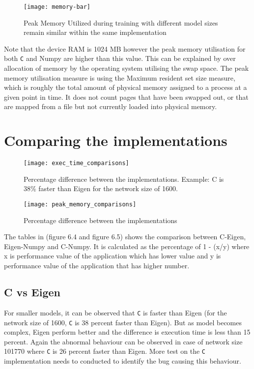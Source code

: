 \begin{figure}[!ht]
	\centering
	\texttt{[image: memory-bar]}
	\caption[Peak Memory Utilisation]{Peak Memory Utilized during training with different model sizes remain similar within the same implementation}
\end{figure}


Note that the device RAM is 1024 MB however the peak memory utilisation for both \verb!C! and Numpy are higher than this value. This can be explained by over allocation of memory by the operating system utilising the swap space. The peak memory utilisation measure is using the Maximum resident set size measure, which is roughly the total amount of physical memory assigned to a process at a given point in time. It does not count pages that have been swapped out, or that are mapped from a file but not currently loaded into physical memory.

\section{Comparing the implementations}

\begin{figure}[!ht]
	\centering
	\texttt{[image: exec\_time\_comparisons]}
	\caption[Execution Time vs Model Parameters]{Percentage difference between the implementations. Example: C is 38\% faster than Eigen for the network size of 1600.}
\end{figure}


\begin{figure}[ht]
	\centering
	\texttt{[image: peak\_memory\_comparisons]}
	\caption[Peak Memory Utilisation]{Percentage difference between the implementations}
\end{figure}

The tables in (figure 6.4 and figure 6.5) shows the comparison between C-Eigen, Eigen-Numpy and C-Numpy. It is calculated as the percentage of 1 - (x/y) where x is performance value of the application which has lower value and y is performance value of the application that has higher number.

\subsection{C vs Eigen}
For smaller models, it can be observed that \verb!C! is faster than Eigen (for the network size of 1600, \verb!C! is 38 percent faster than Eigen). But as model becomes complex, Eigen perform better and the difference is execution time is less than 15 percent. Again the abnormal behaviour can be observed in case of network size 101770 where \verb!C! is 26 percent faster than Eigen. More test on the \verb!C! implementation needs to conducted to identify the bug causing this behaviour.

